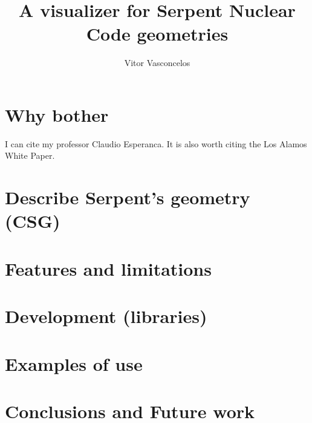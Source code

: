 \documentclass{elsarticle}
\author{Vitor Vasconcelos}
\title{A visualizer for Serpent Nuclear Code geometries}
\begin{document}
\maketitle

\section{Why bother}

I can cite my professor Claudio Esperanca\cite{Esperanca1990}.
It is also worth citing the Los Alamos White Paper\cite{Spencer2017}.

\section{Describe Serpent's geometry (CSG)}
\section{Features and limitations}
\section{Development (libraries)}
\section{Examples of use}
\section{Conclusions and Future work}



\end{document}
